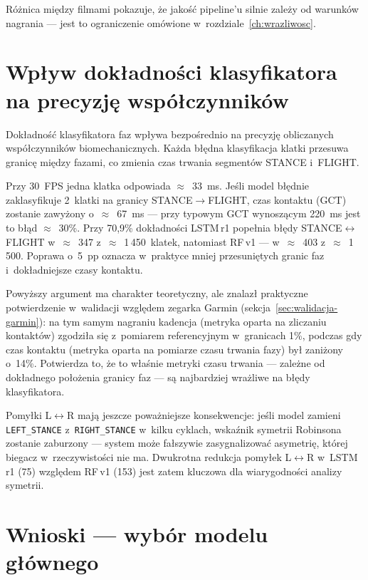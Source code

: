 Różnica między filmami pokazuje, że jakość pipeline'u silnie zależy od warunków nagrania --- jest to ograniczenie omówione w~rozdziale~\ref{ch:wrazliwosc}.

\section{Wpływ dokładności klasyfikatora na precyzję współczynników}
\label{sec:wplyw-na-metryki}

Dokładność klasyfikatora faz wpływa bezpośrednio na precyzję obliczanych współczynników biomechanicznych. Każda błędna klasyfikacja klatki przesuwa granicę między fazami, co zmienia czas trwania segmentów STANCE i~FLIGHT.

Przy 30~FPS jedna klatka odpowiada $\approx$~33~ms. Jeśli model błędnie zaklasyfikuje 2~klatki na granicy STANCE$\to$FLIGHT, czas kontaktu (GCT) zostanie zawyżony o~$\approx$~67~ms --- przy typowym GCT wynoszącym 220~ms jest to błąd $\approx$~30\%. Przy 70{,}9\% dokładności LSTM\,r1 popełnia błędy STANCE$\leftrightarrow$FLIGHT w~$\approx$~347 z~$\approx$~1\,450~klatek, natomiast RF\,v1 --- w~$\approx$~403 z~$\approx$~1\,500. Poprawa o~5~pp oznacza w~praktyce mniej przesuniętych granic faz i~dokładniejsze czasy kontaktu.

Powyższy argument ma charakter teoretyczny, ale znalazł praktyczne potwierdzenie w~walidacji względem zegarka Garmin (sekcja~\ref{sec:walidacja-garmin}): na tym samym nagraniu kadencja (metryka oparta na zliczaniu kontaktów) zgodziła się z~pomiarem referencyjnym w~granicach 1\%, podczas gdy czas kontaktu (metryka oparta na pomiarze czasu trwania fazy) był zaniżony o~14\%. Potwierdza to, że to właśnie metryki czasu trwania --- zależne od dokładnego położenia granicy faz --- są najbardziej wrażliwe na błędy klasyfikatora.

Pomyłki L$\leftrightarrow$R mają jeszcze poważniejsze konsekwencje: jeśli model zamieni \texttt{LEFT\_STANCE} z~\texttt{RIGHT\_STANCE} w~kilku cyklach, wskaźnik symetrii Robinsona zostanie zaburzony --- system może fałszywie zasygnalizować asymetrię, której biegacz w~rzeczywistości nie ma. Dwukrotna redukcja pomyłek L$\leftrightarrow$R w~LSTM\,r1 (75) względem RF\,v1 (153) jest zatem kluczowa dla wiarygodności analizy symetrii.
\newpage
\section{Wnioski --- wybór modelu głównego}
\label{sec:wnioski-klasyfikator}

